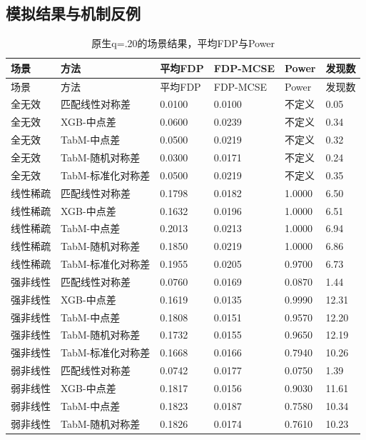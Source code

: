 \documentclass[UTF8,11pt,a4paper]{ctexart}
\begin{document}
\subsection{模拟结果与机制反例}

{
\footnotesize
\begin{longtable}[]{@{}llllll@{}}
\caption{原生q=.20的场景结果，平均FDP与Power}\tabularnewline
\toprule\noalign{}
场景 & 方法 & 平均FDP & FDP-MCSE & Power & 发现数 \\
\midrule\noalign{}
\endfirsthead
\toprule\noalign{}
场景 & 方法 & 平均FDP & FDP-MCSE & Power & 发现数 \\
\midrule\noalign{}
\endhead
\bottomrule\noalign{}
\endlastfoot
全无效 & 匹配线性对称差 & 0.0100 & 0.0100 & 不定义 & 0.05 \\
全无效 & XGB-中点差 & 0.0600 & 0.0239 & 不定义 & 0.34 \\
全无效 & TabM-中点差 & 0.0500 & 0.0219 & 不定义 & 0.32 \\
全无效 & TabM-随机对称差 & 0.0300 & 0.0171 & 不定义 & 0.24 \\
全无效 & TabM-标准化对称差 & 0.0500 & 0.0219 & 不定义 & 0.35 \\
线性稀疏 & 匹配线性对称差 & 0.1798 & 0.0182 & 1.0000 & 6.50 \\
线性稀疏 & XGB-中点差 & 0.1632 & 0.0196 & 1.0000 & 6.51 \\
线性稀疏 & TabM-中点差 & 0.2013 & 0.0213 & 1.0000 & 6.94 \\
线性稀疏 & TabM-随机对称差 & 0.1850 & 0.0219 & 1.0000 & 6.86 \\
线性稀疏 & TabM-标准化对称差 & 0.1955 & 0.0205 & 0.9700 & 6.73 \\
强非线性 & 匹配线性对称差 & 0.0760 & 0.0169 & 0.0870 & 1.44 \\
强非线性 & XGB-中点差 & 0.1619 & 0.0135 & 0.9990 & 12.31 \\
强非线性 & TabM-中点差 & 0.1808 & 0.0151 & 0.9570 & 12.20 \\
强非线性 & TabM-随机对称差 & 0.1732 & 0.0155 & 0.9650 & 12.19 \\
强非线性 & TabM-标准化对称差 & 0.1668 & 0.0166 & 0.7940 & 10.26 \\
弱非线性 & 匹配线性对称差 & 0.0742 & 0.0177 & 0.0750 & 1.39 \\
弱非线性 & XGB-中点差 & 0.1817 & 0.0156 & 0.9030 & 11.61 \\
弱非线性 & TabM-中点差 & 0.1823 & 0.0187 & 0.7580 & 10.34 \\
弱非线性 & TabM-随机对称差 & 0.1826 & 0.0174 & 0.7610 & 10.23 \\

\end{longtable}}
\end{document}
